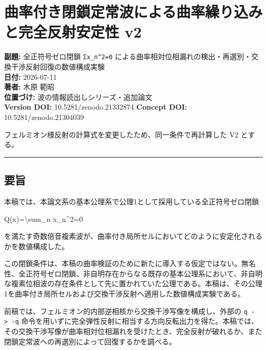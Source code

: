 \documentclass[
  a4paper,
]{article}
\author{}
\date{}
\newenvironment{Shaded}{}{}
\newcommand{\NormalTok}[1]{#1}
\begin{document}
\section{曲率付き閉鎖定常波による曲率繰り込みと完全反射安定性
v2}\label{ux66f2ux7387ux4ed8ux304dux9589ux9396ux5b9aux5e38ux6ce2ux306bux3088ux308bux66f2ux7387ux7e70ux308aux8fbcux307fux3068ux5b8cux5168ux53cdux5c04ux5b89ux5b9aux6027-v2}

\textbf{副題:} 全正符号ゼロ閉鎖 \texttt{Σx\_n\^{}2=0}
による曲率相対位相漏れの検出・再選別・交換干渉反射回復の数値構成実験\\
\textbf{日付:} 2026-07-11\\
\textbf{著者:} 木原 範昭\\
\textbf{位置づけ:} 波の情報読出しシリーズ・追加論文\\
\textbf{Version DOI:} 10.5281/zenodo.21332874 \textbf{Concept DOI:}
10.5281/zenodo.21304039

フェルミオン様反射の計算式を変更したため、同一条件で再計算した V2
とする。

\begin{center}\rule{0.5\linewidth}{0.5pt}\end{center}

\subsection{要旨}\label{ux8981ux65e8}

本稿では、本論文系の基本公理系で公理1として採用している全正符号ゼロ閉鎖

\begin{Shaded}
\begin{Highlighting}[]
\NormalTok{Q(x)=\textbackslash{}sum\_n x\_n\^{}2=0}
\end{Highlighting}
\end{Shaded}

を満たす奇数倍音複素波が、曲率付き局所セルにおいてどのように安定化されるかを数値構成した。

この閉鎖条件は、本稿の曲率検証のために新たに導入する仮定ではない。無名性、全正符号ゼロ閉鎖、非自明存在からなる既存の基本公理系において、非自明な複素位相波の存在条件として先に置かれていた公理である。本稿は、その公理1を曲率付き局所セルおよび交換干渉反射へ適用した数値構成実験である。

前稿では、フェルミオン的内部逆相核から交換干渉写像を構成し、外部の
\texttt{q\ -\textgreater{}\ -q}
命令を用いずに完全弾性反射に相当する方向反転出力を得た。本稿では、その交換干渉写像が曲率相対位相漏れを受けたとき、完全反射が破れるか、また閉鎖定常波への再選別によって回復するかを調べる。
\end{document}

